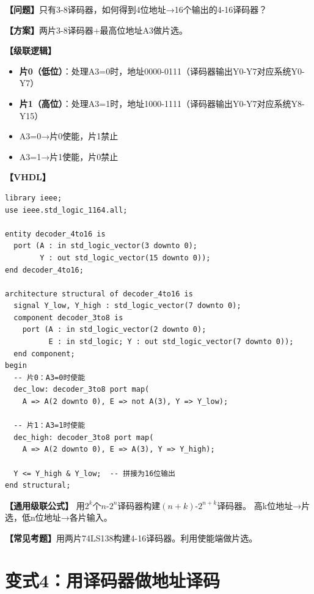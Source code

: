 \begin{detailbox}[完整教学]

\textbf{【问题】}只有3-8译码器，如何得到4位地址→16个输出的4-16译码器？

\textbf{【方案】}两片3-8译码器+最高位地址A3做片选。

\textbf{【级联逻辑】}
\begin{itemize}
  \item \textbf{片0（低位）}：处理A3=0时，地址0000-0111（译码器输出Y0-Y7对应系统Y0-Y7）
  \item \textbf{片1（高位）}：处理A3=1时，地址1000-1111（译码器输出Y0-Y7对应系统Y8-Y15）
  \item A3=0→片0使能，片1禁止
  \item A3=1→片1使能，片0禁止
\end{itemize}

\textbf{【VHDL】}
\begin{lstlisting}
library ieee;
use ieee.std_logic_1164.all;

entity decoder_4to16 is
  port (A : in std_logic_vector(3 downto 0);
        Y : out std_logic_vector(15 downto 0));
end decoder_4to16;

architecture structural of decoder_4to16 is
  signal Y_low, Y_high : std_logic_vector(7 downto 0);
  component decoder_3to8 is
    port (A : in std_logic_vector(2 downto 0);
          E : in std_logic; Y : out std_logic_vector(7 downto 0));
  end component;
begin
  -- 片0：A3=0时使能
  dec_low: decoder_3to8 port map(
    A => A(2 downto 0), E => not A(3), Y => Y_low);

  -- 片1：A3=1时使能
  dec_high: decoder_3to8 port map(
    A => A(2 downto 0), E => A(3), Y => Y_high);

  Y <= Y_high & Y_low;  -- 拼接为16位输出
end structural;
\end{lstlisting}

\textbf{【通用级联公式】}
用$2^k$个$n$-$2^n$译码器构建$(n+k)$-$2^{n+k}$译码器。
高k位地址→片选，低n位地址→各片输入。

\textbf{【常见考题】}用两片74LS138构建4-16译码器。利用使能端做片选。

\end{detailbox}


\section{变式4：用译码器做地址译码}


